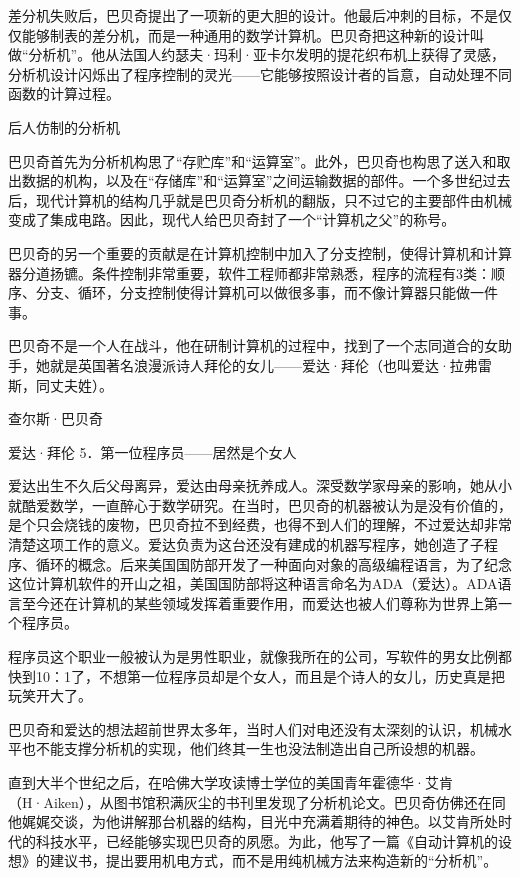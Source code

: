 \documentclass[12pt,UTF8]{ctexbook}
\begin{document}
差分机失败后，巴贝奇提出了一项新的更大胆的设计。他最后冲刺的目标，不是仅仅能够制表的差分机，而是一种通用的数学计算机。巴贝奇把这种新的设计叫做“分析机”。他从法国人约瑟夫·玛利·亚卡尔发明的提花织布机上获得了灵感，分析机设计闪烁出了程序控制的灵光——它能够按照设计者的旨意，自动处理不同函数的计算过程。

后人仿制的分析机

巴贝奇首先为分析机构思了“存贮库”和“运算室”。此外，巴贝奇也构思了送入和取出数据的机构，以及在“存储库”和“运算室”之间运输数据的部件。一个多世纪过去后，现代计算机的结构几乎就是巴贝奇分析机的翻版，只不过它的主要部件由机械变成了集成电路。因此，现代人给巴贝奇封了一个“计算机之父”的称号。

巴贝奇的另一个重要的贡献是在计算机控制中加入了分支控制，使得计算机和计算器分道扬镳。条件控制非常重要，软件工程师都非常熟悉，程序的流程有3类：顺序、分支、循环，分支控制使得计算机可以做很多事，而不像计算器只能做一件事。

巴贝奇不是一个人在战斗，他在研制计算机的过程中，找到了一个志同道合的女助手，她就是英国著名浪漫派诗人拜伦的女儿——爱达·拜伦（也叫爱达·拉弗雷斯，同丈夫姓）。

查尔斯·巴贝奇

爱达·拜伦
5．第一位程序员——居然是个女人

爱达出生不久后父母离异，爱达由母亲抚养成人。深受数学家母亲的影响，她从小就酷爱数学，一直醉心于数学研究。在当时，巴贝奇的机器被认为是没有价值的，是个只会烧钱的废物，巴贝奇拉不到经费，也得不到人们的理解，不过爱达却非常清楚这项工作的意义。爱达负责为这台还没有建成的机器写程序，她创造了子程序、循环的概念。后来美国国防部开发了一种面向对象的高级编程语言，为了纪念这位计算机软件的开山之祖，美国国防部将这种语言命名为ADA（爱达）。ADA语言至今还在计算机的某些领域发挥着重要作用，而爱达也被人们尊称为世界上第一个程序员。

程序员这个职业一般被认为是男性职业，就像我所在的公司，写软件的男女比例都快到10：1了，不想第一位程序员却是个女人，而且是个诗人的女儿，历史真是把玩笑开大了。

巴贝奇和爱达的想法超前世界太多年，当时人们对电还没有太深刻的认识，机械水平也不能支撑分析机的实现，他们终其一生也没法制造出自己所设想的机器。

直到大半个世纪之后，在哈佛大学攻读博士学位的美国青年霍德华·艾肯（H·Aiken），从图书馆积满灰尘的书刊里发现了分析机论文。巴贝奇仿佛还在同他娓娓交谈，为他讲解那台机器的结构，目光中充满着期待的神色。以艾肯所处时代的科技水平，已经能够实现巴贝奇的夙愿。为此，他写了一篇《自动计算机的设想》的建议书，提出要用机电方式，而不是用纯机械方法来构造新的“分析机”。
\end{document}
